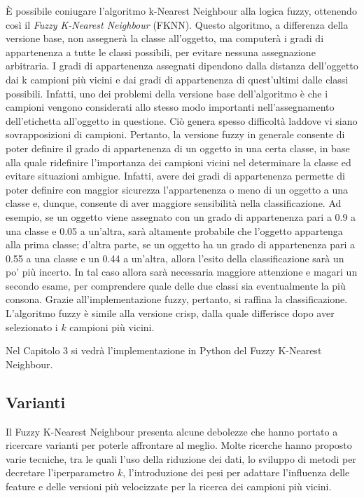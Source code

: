 \documentclass[11pt,  oneside, openany]{book}
\begin{document}
\`E possibile coniugare l'algoritmo k-Nearest Neighbour alla logica fuzzy, ottenendo così il \textit{Fuzzy K-Nearest Neighbour} (FKNN). Questo algoritmo, a differenza della versione base, non assegnerà la classe all'oggetto, ma computerà i gradi di appartenenza a tutte le classi possibili, per evitare nessuna assegnazione arbitraria. I gradi di appartenenza assegnati dipendono dalla distanza dell'oggetto dai k campioni più vicini e dai gradi di appartenenza di quest'ultimi dalle classi possibili. Infatti, uno dei problemi della versione base dell'algoritmo è che i campioni vengono considerati allo stesso modo importanti nell'assegnamento dell'etichetta all'oggetto in questione. Ciò genera spesso difficoltà laddove vi siano sovrapposizioni di campioni. Pertanto, la versione fuzzy  in generale consente di poter definire il grado di appartenenza di un oggetto in una certa classe, in base alla quale ridefinire l'importanza dei campioni vicini nel determinare la classe ed evitare situazioni ambigue. Infatti, avere dei gradi di appartenenza permette di poter definire con maggior sicurezza l'appartenenza o meno di un oggetto a una classe e, dunque, consente di aver maggiore sensibilità nella classificazione. Ad esempio, se un oggetto viene assegnato con un grado di appartenenza pari a 0.9 a una classe e 0.05 a un'altra, sarà altamente probabile che l'oggetto appartenga alla prima classe; d'altra parte, se un oggetto ha un grado di appartenenza pari a 0.55 a una classe e un 0.44 a un'altra, allora l'esito della classificazione sarà un po' più incerto. In tal caso allora sarà necessaria maggiore attenzione e magari un secondo esame, per comprendere quale delle due classi sia eventualmente la più consona. Grazie all'implementazione fuzzy, pertanto, si raffina la classificazione. L'algoritmo fuzzy è simile alla versione crisp, dalla quale differisce dopo aver selezionato i $k$ campioni più vicini. 

Nel Capitolo 3 si vedrà l'implementazione in Python del Fuzzy K-Nearest Neighbour. 


\subsection{Varianti}

Il Fuzzy K-Nearest Neighbour presenta alcune debolezze che hanno portato a ricercare varianti per poterle affrontare al meglio. Molte ricerche hanno proposto varie tecniche, tra le quali l'uso della riduzione dei dati, lo sviluppo di metodi per decretare l'iperparametro $k$, l'introduzione dei pesi per adattare l'influenza delle feature e delle versioni più velocizzate per la ricerca dei campioni più vicini. 
\end{document}
